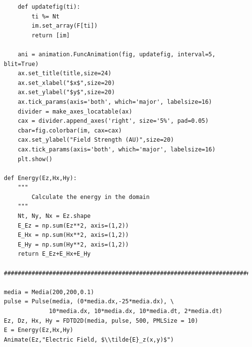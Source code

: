 \documentclass[12pt,twocolumn]{article}
\begin{document}
\begin{verbatim}
    def updatefig(ti):
        ti %= Nt
        im.set_array(F[ti])
        return [im]

    ani = animation.FuncAnimation(fig, updatefig, interval=5, blit=True)
    ax.set_title(title,size=24)
    ax.set_xlabel("$x$",size=20)
    ax.set_ylabel("$y$",size=20)
    ax.tick_params(axis='both', which='major', labelsize=16)
    divider = make_axes_locatable(ax)
    cax = divider.append_axes('right', size='5%', pad=0.05)
    cbar=fig.colorbar(im, cax=cax)
    cax.set_ylabel("Field Strength (AU)",size=20)
    cax.tick_params(axis='both', which='major', labelsize=16)
    plt.show()

def Energy(Ez,Hx,Hy):
    """
        Calculate the energy in the domain
    """
    Nt, Ny, Nx = Ez.shape
    E_Ez = np.sum(Ez**2, axis=(1,2))
    E_Hx = np.sum(Hx**2, axis=(1,2))
    E_Hy = np.sum(Hy**2, axis=(1,2))
    return E_Ez+E_Hx+E_Hy

###############################################################################

media = Media(200,200,0.1)
pulse = Pulse(media, (0*media.dx,-25*media.dx), \
             10*media.dx, 10*media.dx, 10*media.dt, 2*media.dt)
Ez, Dz, Hx, Hy = FDTD2D(media, pulse, 500, PMLSize = 10)
E = Energy(Ez,Hx,Hy)
Animate(Ez,"Electric Field, $\\tilde{E}_z(x,y)$")
\end{verbatim}
\end{document}
